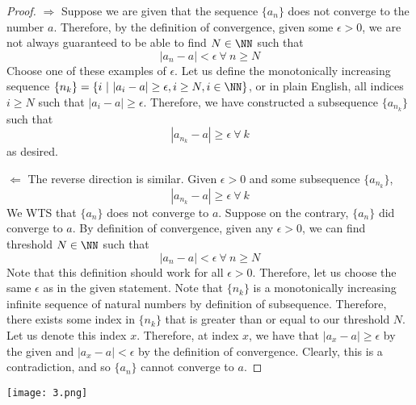\documentclass[12pt]{scrartcl}
\begin{document}
\begin{proof}
  
\hfill

$\Longrightarrow$ Suppose we are given that the sequence $\{a_n\}$ does not converge to the 
number $a$. Therefore, by the definition of convergence, given some $\epsilon > 0$, 
we are not always guaranteed to be able to find $N \in \NN$ such that 
\[|a_n - a| < \epsilon \ \forall \ n \geq N\]
Choose one of these examples of $\epsilon$. Let us define the monotonically increasing sequence 
$\{n_k\} = \{i \ | \ |a_i - a| \geq \epsilon, i \geq N, i \in \NN\}$, or in plain English, all indices $i \geq N$
such that $|a_i - a| \geq \epsilon$.
Therefore, we have constructed a subsequence $\{a_{n_k}\}$ such that 
\[|a_{n_k} - a| \geq \epsilon \ \forall \ k\]
as desired.

\hfill

$\Longleftarrow$ The reverse direction is similar. Given $\epsilon > 0$ and some subsequence $\{a_{n_k}\}$, 
\[|a_{n_k} - a| \geq \epsilon \ \forall \ k\]
We WTS that $\{a_n\}$ does not converge to $a$. Suppose on the contrary, $\{a_n\}$ did converge to $a$. 
By definition of convergence, given any $\epsilon > 0$, we can find threshold $N \in \NN$ such that 
\[|a_n - a| < \epsilon \ \forall \ n \geq N\]
Note that this definition should work for all $\epsilon > 0$. Therefore,
let us choose the same $\epsilon$ as in the given statement. Note that $\{n_k\}$ is a monotonically increasing infinite sequence 
of natural numbers by definition of subsequence. Therefore, there exists some index in $\{n_k\}$ that is greater than or equal to
our threshold $N$. Let us denote this index $x$. Therefore, at index $x$, we have that $|a_x - a| \geq \epsilon$ by the given and $|a_x - a| < \epsilon$ by the definition of convergence. Clearly, this is a contradiction, 
and so $\{a_n\}$ cannot converge to $a$. 

\end{proof}

\newpage

\texttt{[image: 3.png]}
\end{document}
